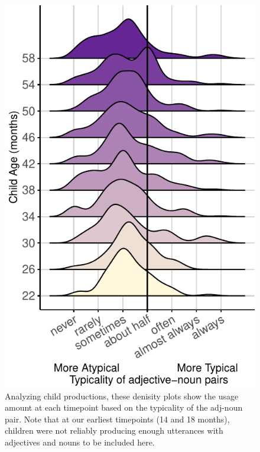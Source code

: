 \documentclass[10pt, letterpaper]{article}
\newenvironment{CodeChunk}{}{}
\begin{document}
\begin{CodeChunk}
\begin{figure}[tb]

{\centering \includegraphics{figs/kid_plot-1} 

}

\caption[Analyzing child productions, these denisity plots show the usage amount at each timepoint based on the typicality of the adj-noun pair]{Analyzing child productions, these denisity plots show the usage amount at each timepoint based on the typicality of the adj-noun pair. Note that at our earliest timepoints (14 and 18 months), children were not reliably producing enough utterances with adjectives and nouns to be included here.}\label{fig:kid_plot}
\end{figure}
\end{CodeChunk}
\end{document}
